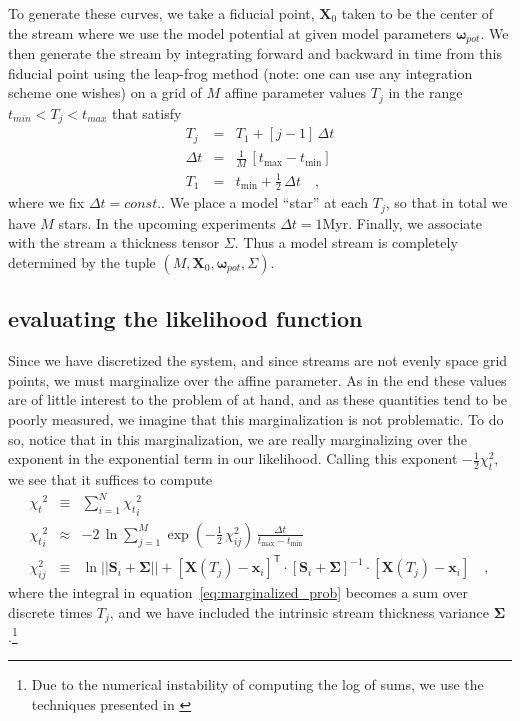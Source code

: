 \documentclass[12pt,preprint]{aastex}
\theoremstyle{plain}
\theoremstyle{definition}
\newcommand{\mtensor}[1]{\boldsymbol{#1}}
\newcommand{\mS}{\mtensor{S}}
\newcommand{\mSigma}{\mtensor{\Sigma}}
\newcommand{\mvector}[1]{\mtensor{#1}}
\newcommand{\vx}{\mvector{x}}
\newcommand{\vX}{\mvector{X}}
\newcommand{\vomega}{\mvector{\omega}}
\newcommand{\inverse}[1]{{#1}^{-1}}
\newcommand{\transpose}[1]{{#1}^{\textsf{T}}}
\renewcommand{\det}[1]{||{#1}||}
\newcommand{\unit}[1]{\mathrm{#1}}
\newcommand{\Myr}{\unit{Myr}}
\newcommand{\margchi}{{\chi_t}}
\newcommand{\tmin}{t_{\mathrm{min}}}
\newcommand{\tmax}{t_{\mathrm{max}}}
\newcommand{\equationname}{equation}
\begin{document}
To generate these curves, we take a fiducial point, $\vX_0$ taken to be the center of the stream where we use the model potential at given model parameters $\vomega_{pot}$. We then generate the stream by integrating forward and backward in time from this fiducial point using the leap-frog method (note: one can use any integration scheme one wishes) on a grid of $M$ affine parameter values $T_j$ in the range $t_{min} < T_j < t_{max}$ that satisfy
\begin{eqnarray}\displaystyle
T_j &=& T_1 + [j-1]\,\Delta t
\nonumber\\
\Delta t &=& \frac{1}{M}\,[\tmax-\tmin]
\nonumber\\
T_1 &=& \tmin+\frac{1}{2}\,\Delta t
\quad,
\end{eqnarray}
where we fix $\Delta t = const.$. We place a model ``star'' at each $T_j$, so that in total we have $M$ stars. In the upcoming experiments $\Delta t = 1 \Myr$. Finally, we associate with the stream a thickness tensor $\Sigma$. Thus a model stream is completely determined by the tuple $(M, \vX_0, \vomega_{pot}, \Sigma)$.

\subsection{evaluating the likelihood function}
Since we have discretized the system, and since streams are not evenly space grid points, we must marginalize over the affine parameter. As in the end these values are of little interest to the problem of at hand, and as these quantities tend to be poorly measured, we imagine that this marginalization is not problematic. To do so, notice that in this marginalization, we are really marginalizing over the exponent in the exponential term in our likelihood. Calling this exponent $-\frac{1}{2}\chi_t^2$, we see that it suffices to compute
\begin{eqnarray}\displaystyle
\margchi^2 &\equiv& \sum_{i=1}^N \margchi_i^2
\nonumber\\
\margchi_i^2 &\approx& -2\,\ln\sum_{j=1}^M \exp(-\frac{1}{2}\,\chi_{ij}^2)\,\frac{\Delta t}{\tmax-\tmin}
\nonumber\\
\chi_{ij}^2 &\equiv& \ln\det{\mS_i + \mSigma}
  + \transpose{\left[\vX(T_j) - \vx_i\right]}
  \cdot\inverse{\left[\mS_i+\mSigma\right]}\cdot\left[\vX(T_j) - \vx_i\right]
\quad,
\end{eqnarray}
where the integral in \equationname~\eqref{eq:marginalized_prob} becomes a sum
over discrete times $T_j$, and we have included the intrinsic stream
thickness variance $\mSigma$.\footnote{Due to the numerical instability of computing the log of sums, we use the techniques presented in \cite{BHR}}
\end{document}
